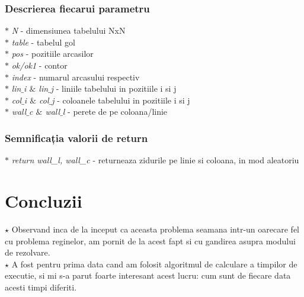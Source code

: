 \documentclass{article}
\begin{document}
\subsubsection{Descrierea fiecarui parametru}
\hspace*{0.5cm} $\ast$ \textit{N} - dimensiunea tabelului NxN \\
\hspace*{0.5cm} $\ast$ \textit{table} - tabelul gol \\ 
\hspace*{0.5cm} $\ast$ \textit{pos} - pozitiile arcasilor \\
\hspace*{0.5cm} $\ast$ \textit{ok/ok1} - contor\\
\hspace*{0.5cm} $\ast$ \textit{index} - numarul arcasului respectiv \\ 
\hspace*{0.5cm} $\ast$ \textit{lin$\_$i $\&$ lin$\_$j} - liniile tabelului in pozitiile i si j \\ 
\hspace*{0.5cm} $\ast$ \textit{col$\_$i $\&$ col$\_$j} - coloanele tabelului in pozitiile i si j \\
\hspace*{0.5cm} $\ast$ \textit{wall$\_$c $\&$ wall$\_$l} - perete de pe coloana/linie 

\subsubsection{Semnificația valorii de return}

$\ast$ \textit{return wall\_l, wall\_c} - returneaza zidurile pe linie si coloana, in mod aleatoriu

\newpage

\section{Concluzii}
\vspace{0.2cm} 
\hspace{0.5cm}$\star$  Observand inca de la inceput ca aceasta problema seamana intr-un oarecare fel cu problema reginelor, am pornit de la acest fapt si cu gandirea asupra modului de rezolvare. \\

$\star$ A fost pentru prima data cand am folosit algoritmul de calculare a timpilor de executie, si mi s-a parut foarte interesant acest lucru: cum sunt de fiecare data acesti timpi diferiti. \\
\end{document}
